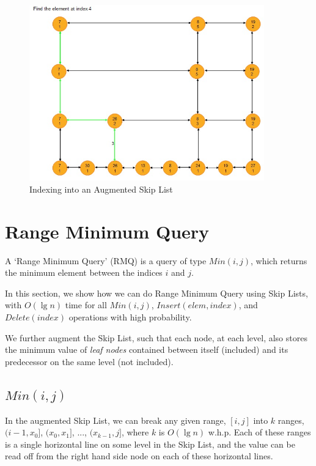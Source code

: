 \documentclass{article}
\begin{document}
\begin{figure}[h!]
  \begin{center}
    \includegraphics[width=4in]{images/Indexable.jpg}
    \caption{Indexing into an Augmented Skip List}
    \label{fig:Indexable}
  \end{center}
\end {figure}



\clearpage

\section{Range Minimum Query}

A `Range Minimum Query' (RMQ) is a query of type $Min(i,j)$, which
returns the minimum element between the indices $i$ and $j$.

In this section, we show how we can do Range Minimum Query using Skip
Lists, with $O(\lg{n})$ time for all $Min(i,j)$, $Insert(elem,
index)$, and $Delete(index)$ operations with high probability.

We further augment the Skip List, such that each node, at each level,
also stores the minimum value of \emph{leaf nodes} contained between
itself (included) and its predecessor on the same level (not
included).

\subsection{$Min(i,j)$}

In the augmented Skip List, we can break any given range, $[i,j]$ into
$k$ ranges, $(i-1,x_0]$, $(x_0, x_1]$, ..., $(x_{k-1}, j]$, where $k$
      is $O(\lg{n})$ w.h.p.  Each of these ranges is a single
      horizontal line on some level in the Skip List, and the value
      can be read off from the right hand side node on each of these
      horizontal lines.
\end{document}
